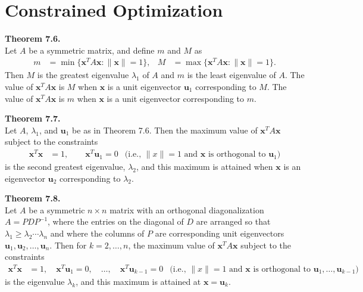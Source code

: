 \documentclass[10pt]{book}
\newenvironment{boxthm}{\begin{mdframed}[backgroundcolor=gray!30,nobreak=true]}{\end{mdframed}}
\newcommand{\vect}[1]{\ensuremath{\boldsymbol{\mathbf{#1}}}}
\begin{document}
\vfill


\section{Constrained Optimization}

\begin{boxthm}
	\textbf{Theorem 7.6.} \\
	Let $A$ be a symmetric matrix, and define $m$ and $M$ as
	\begin{align*}
	m &= \min\{ \vect{x}^TA\vect{x}:\|\vect{x}\|=1 \}, &
	M &= \max\{ \vect{x}^TA\vect{x}:\|\vect{x}\|=1 \}.
	\end{align*}
	Then $M$ is the greatest eigenvalue $\lambda_1$ of $A$ and $m$ is the least eigenvalue of $A$. The value of $\vect{x}^TA\vect{x}$ is $M$ when $\vect{x}$ is a unit eigenvector $\vect{u}_1$ corresponding to $M$. The value of $\vect{x}^TA\vect{x}$ is $m$ when $\vect{x}$ is a unit eigenvector corresponding to $m$.
\end{boxthm}
\begin{boxthm}
	\textbf{Theorem 7.7.} \\
	Let $A$, $\lambda_1$, and $\vect{u}_1$ be as in Theorem 7.6. Then the maximum value of $\vect{x}^TA\vect{x}$ subject to the constraints
	\begin{align*}
	\vect{x}^T\vect{x} &= 1, \qquad \vect{x}^T\vect{u}_1 = 0 &
	\text{(i.e., $\|x\|=1$ and $\vect{x}$ is orthogonal to $\vect{u}_1$)}
	\end{align*}
	is the second greatest eigenvalue, $\lambda_2$, and this maximum is attained when $\vect{x}$ is an eigenvector $\vect{u}_2$ corresponding to $\lambda_2$.
\end{boxthm}
\begin{boxthm}
	\textbf{Theorem 7.8.} \\
	Let $A$ be a symmetric $n\times n$ matrix with an orthogonal diagonalization $A=PDP^{-1}$, where the entries on the diagonal of $D$ are arranged so that $\lambda_1\geq\lambda_2\cdots\lambda_n$ and where the columns of $P$ are corresponding unit eigenvectors $\vect{u}_1,\vect{u}_2,\ldots,\vect{u}_n$. Then for $k=2,\ldots,n$, the maximum value of $\vect{x}^TA\vect{x}$ subject to the constraints
	\begin{align*}
	\vect{x}^T\vect{x} &= 1, \quad
	\vect{x}^T\vect{u}_1 = 0, \quad \ldots, \quad
	\vect{x}^T\vect{u}_{k-1} = 0 &
	\text{(i.e., $\|x\|=1$ and $\vect{x}$ is orthogonal to $\vect{u}_1,\ldots,\vect{u}_{k-1}$)}
	\end{align*}
	is the eigenvalue $\lambda_k$, and this maximum is attained at $\vect{x}=\vect{u}_k$.
\end{boxthm}
\end{document}
